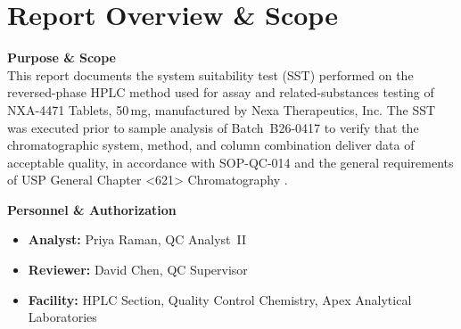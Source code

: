 \section{Report Overview \& Scope}

\begin{minipage}[t]{0.61\textwidth}
\vspace{0pt}
\textbf{Purpose \& Scope}\\
This report documents the system suitability test (SST) performed on the reversed-phase HPLC method used for assay and related-substances testing of NXA-4471 Tablets, 50\,mg, manufactured by Nexa Therapeutics, Inc. The SST was executed prior to sample analysis of Batch~B26-0417 to verify that the chromatographic system, method, and column combination deliver data of acceptable quality, in accordance with SOP-QC-014 \cite{ApexSOPQC014} and the general requirements of USP General Chapter <621> Chromatography \cite{USP621}.

\vspace{6pt}
\textbf{Personnel \& Authorization}
\begin{itemize}
  \item \textbf{Analyst:} Priya Raman, QC Analyst~II
  \item \textbf{Reviewer:} David Chen, QC Supervisor
  \item \textbf{Facility:} HPLC Section, Quality Control Chemistry, Apex Analytical Laboratories
\end{itemize}
\end{minipage}%
\hfill%
\begin{minipage}[t]{0.36\textwidth}
\vspace{0pt}
\begin{tcolorbox}[
  enhanced,
  colframe=HplcInk,
  colback=HplcMist,
  colbacktitle=HplcInk,
  coltitle=white,
  arc=4pt,
  boxrule=0.8pt,
  title={\faInfoCircle\hspace{4pt}\textbf{Report Information}},
  fonttitle=\small\bfseries,
  left=6pt, right=6pt, top=4pt, bottom=4pt,
]
\small
{}
\end{tcolorbox}
\end{minipage}
